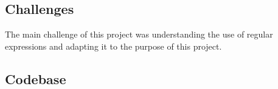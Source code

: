 \subsection{Challenges}\label{sec:ps7:challenges}

The main challenge of this project was understanding the use of regular expressions and adapting it to the purpose of this project.

\subsection{Codebase}\label{sec:ps7:code}




\newpage
